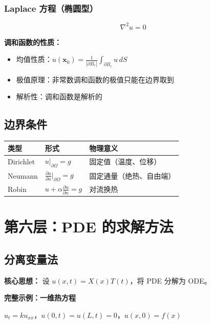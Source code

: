 \subsubsection{Laplace 方程（椭圆型）}

\[
\nabla^2 u = 0
\]

\textbf{调和函数的性质：}
\begin{itemize}
  \item 均值性质：$u(\mathbf{x}_0) = \frac{1}{|\partial B_r|}\int_{\partial B_r} u\,dS$
  \item 极值原理：非常数调和函数的极值只能在边界取到
  \item 解析性：调和函数是解析的
\end{itemize}

\subsection{边界条件}

\begin{center}
\begin{tabular}{p{2.5cm}p{4cm}p{5cm}}
\toprule
\textbf{类型} & \textbf{形式} & \textbf{物理意义} \\
\midrule
Dirichlet & $u|_{\partial\Omega} = g$ & 固定值（温度、位移） \\
Neumann & $\frac{\partial u}{\partial n}\big|_{\partial\Omega} = g$ & 固定通量（绝热、自由端） \\
Robin & $u + \alpha\frac{\partial u}{\partial n} = g$ & 对流换热 \\
\bottomrule
\end{tabular}
\end{center}

\section{第六层：PDE 的求解方法}

\subsection{分离变量法}

\textbf{核心思想：} 设 $u(x,t) = X(x)T(t)$，将 PDE 分解为 ODE。

\textbf{完整示例：一维热方程}

$u_t = ku_{xx}$，$u(0,t) = u(L,t) = 0$，$u(x,0) = f(x)$

